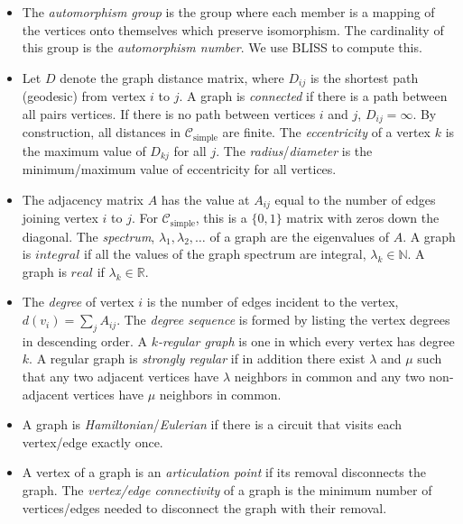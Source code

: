 \documentclass[12pt]{article}
\newcommand{\note}[1]{\todo[inline,size=\tiny]{#1}}
\newcommand{\SIMPLECLASS}{\mathcal{C}_\text{simple}}
\begin{document}
\begin{itemize}

\item The \textit{automorphism group} is the group where each member is a mapping of the vertices onto themselves which preserve isomorphism. 
The cardinality of this group is the \textit{automorphism number}.
We use BLISS \note{REF} to compute this.

\item Let $D$ denote the graph distance matrix, where $D_{ij}$ is the shortest path (geodesic) from vertex $i$ to $j$.
A graph is \textit{connected} if there is a path between all pairs vertices.
If there is no path between vertices $i$ and $j$, $D_{ij}=\infty$.
By construction, all distances in $\SIMPLECLASS$ are finite.
The \textit{eccentricity} of a vertex $k$ is the maximum value of $D_{k j}$ for all $j$.
The \textit{radius}/\textit{diameter} is the minimum/maximum value of eccentricity for all vertices.

\item The adjacency matrix $A$ has the value at $A_{ij}$ equal to the number of edges joining vertex $i$ to $j$. 
For $\SIMPLECLASS$, this is a $\{0,1\}$ matrix with zeros down the diagonal. 
The \textit{spectrum}, $\lambda_1, \lambda_2, \ldots$ of a graph are the eigenvalues of $A$. 
A graph is $integral$ if all the values of the graph spectrum are integral, $\lambda_k \in \mathbb{N}$. 
A graph is $real$ if $\lambda_k \in \mathbb{R}$.

\item The \textit{degree} of vertex $i$ is the number of edges incident to the vertex, $d(v_i) = \sum_j A_{ij}$. 
The \textit{degree sequence} is formed by listing the vertex degrees in descending order.  
A \textit{$k$-regular graph} is one in which every vertex has degree $k$. 
A regular graph is \textit{strongly regular} if in addition there exist $\lambda$ and $\mu$ such that any two adjacent vertices have $\lambda$ neighbors in common and any two non-adjacent vertices have $\mu$ neighbors in common. 

\item A graph is \textit{Hamiltonian}/\textit{Eulerian} if there is a circuit that visits each vertex/edge exactly once.

\item A vertex of a graph is an \textit{articulation point} if its removal disconnects the graph. 
The \textit{vertex/edge connectivity} of a graph is the minimum number of vertices/edges needed to disconnect the graph with their removal. 


\end{itemize}
\end{document}
